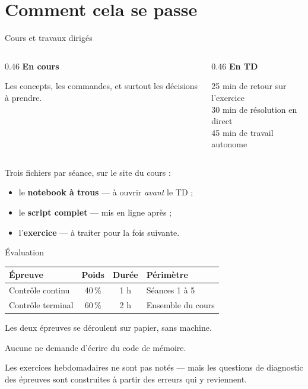 \documentclass[10pt,aspectratio=169]{beamer}
\begin{document}
\section{Comment cela se passe}

\begin{frame}{Cours et travaux dirigés}
\begin{columns}[T]
\begin{column}{0.46\textwidth}
\textbf{En cours}

\vspace{0.5em}
Les concepts, les commandes, et surtout les décisions à prendre.
\end{column}
\begin{column}{0.46\textwidth}
\textbf{En TD}

\vspace{0.5em}
25 min de retour sur l'exercice \\
30 min de résolution en direct \\
45 min de travail autonome
\end{column}
\end{columns}

\vspace{1.8em}
Trois fichiers par séance, sur le site du cours :

\vspace{0.6em}
\begin{itemize}
  \item le \textbf{notebook à trous} --- à ouvrir \emph{avant} le TD ;
  \item le \textbf{script complet} --- mis en ligne après ;
  \item l'\textbf{exercice} --- à traiter pour la fois suivante.
\end{itemize}
\end{frame}

\begin{frame}{Évaluation}
\begin{center}
\begin{tabular}{lccl}
\toprule
\textbf{Épreuve} & \textbf{Poids} & \textbf{Durée} & \textbf{Périmètre} \\
\midrule
Contrôle continu & 40\,\% & 1 h & Séances 1 à 5 \\
Contrôle terminal & 60\,\% & 2 h & Ensemble du cours \\
\bottomrule
\end{tabular}
\end{center}

\vspace{1.5em}
Les deux épreuves se déroulent \alert{sur papier, sans machine}.

\vspace{0.8em}
Aucune ne demande d'écrire du code de mémoire.

\vspace{1.2em}
Les exercices hebdomadaires ne sont pas notés --- mais les questions de diagnostic des épreuves sont construites à partir des erreurs qui y reviennent.
\end{frame}
\end{document}

